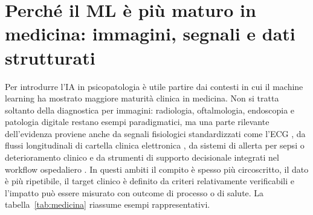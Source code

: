 \documentclass[11pt,a4paper]{article}
\begin{document}
\section{Perché il ML è più maturo in medicina: immagini, segnali e dati strutturati}
\label{sec:medicina}

Per introdurre l'IA in psicopatologia è utile partire dai contesti in cui il machine learning ha mostrato maggiore maturità clinica in medicina. Non si tratta soltanto della diagnostica per immagini: radiologia, oftalmologia, endoscopia e patologia digitale restano esempi paradigmatici, ma una parte rilevante dell'evidenza proviene anche da segnali fisiologici standardizzati come l'ECG \cite{ribeiro2020,yao2021}, da flussi longitudinali di cartella clinica elettronica \cite{tomasev2019}, da sistemi di allerta per sepsi o deterioramento clinico \cite{adams2022} e da strumenti di supporto decisionale integrati nel workflow ospedaliero \cite{topol2019}. In questi ambiti il compito è spesso più circoscritto, il dato è più ripetibile, il target clinico è definito da criteri relativamente verificabili e l'impatto può essere misurato con outcome di processo o di salute. La tabella~\ref{tab:medicina} riassume esempi rappresentativi.
\end{document}
